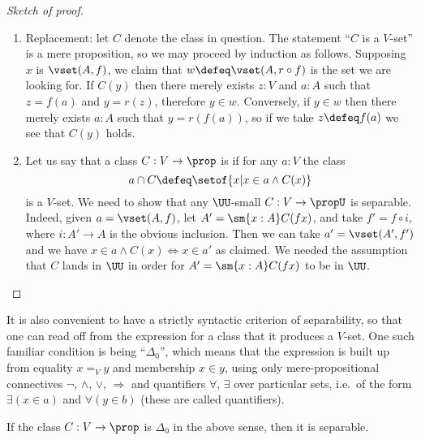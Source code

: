 \begin{proof}[Sketch of proof]
\begin{enumerate}
  \item Replacement: let $C$ denote the class in question.
    The statement ``$C$ is a $V$-set'' is a mere proposition, so we may
    proceed by induction as follows. Supposing $x$ is $\vset(A, f)$, we claim that $w
    \defeq \vset(A, r \circ f)$ is the set we are looking for.  If $C(y)$ then there merely exists
    $z : V$ and $a : A$ such that $z = f(a)$ and $y = r(z)$, therefore $y \in w$.
    Conversely, if $y \in w$ then there merely exists $a : A$ such that $y = r(f(a))$, so
    if we take $z \defeq f(a)$ we see that $C(y)$ holds.

  \item Let us say that a class $C: V\to\prop$ is 
    if for any $a:V$ the class
  \begin{equation*}
    a \cap C \defeq\setof{x | x\in a \wedge C(x)}
  \end{equation*}
  is a $V$-set.
We need to show that any $\UU$-small  $C: V \to \propU$ is separable. Indeed, given $a=\vset(A,f)$, let $A' = \sm{x:A}C(fx)$, and take $f' = f\circ i$, where $i : A' \to A$ is the obvious inclusion.  Then we can take $a' = \vset(A',f')$ and we have $x\in a\wedge C(x) \Leftrightarrow x\in a'$ as claimed.  We needed the assumption that $C$ lands in $\UU$ in order for $A' = \sm{x:A}C(fx)$ to be in $\UU$.\qedhere
\end{enumerate}
\end{proof}

It is also convenient to have a strictly syntactic criterion of separability, so that one can read off from the expression for a class that it produces a $V$-set.  One such familiar condition is being ``$\Delta_0$'', which means that the expression is built up from equality $x=_V y$ and membership $x\in y$, using only mere-propositional connectives $\neg$, $\land$, $\lor$, $\Rightarrow$ and quantifiers $\forall$, $\exists$ over particular sets, i.e.\ of the form $\exists(x\in a)$ and $\forall(y\in b)$ (these are called  quantifiers).%

\begin{cor}\label{cor:Delta0sep}
If the class $C: V \to \prop$ is $\Delta_0$ in the above sense, then it is separable.
\end{cor}
%

